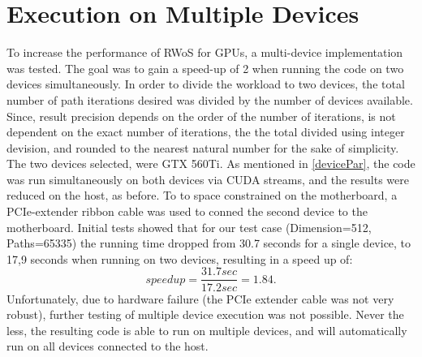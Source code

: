 \section{Execution on Multiple Devices}
To increase the performance of \Gls{RWoS} for \Glspl{GPU}, a multi-device implementation
was tested.  The goal was to gain a speed-up of 2 when running the code on two devices
simultaneously.  In order to divide the workload to two devices, the total number
of path iterations desired was divided by the number of devices available. Since,
result precision depends on the order of the number of iterations, is not dependent
on the exact number of iterations, the the total divided using integer devision,
and rounded to the nearest natural number for the sake of simplicity.  The two
devices selected, were GTX 560Ti. As mentioned in \ref{devicePar}, the code
was run simultaneously on both devices via CUDA streams, and the results were reduced
on the host, as before. To to space constrained on the motherboard, a PCIe-extender
ribbon cable was used to conned the second device to the motherboard. Initial tests
showed that for our test case (Dimension=512, Paths=65335) the running time dropped from
30.7 seconds for a single device, to 17,9 seconds when running on two devices,
resulting in a speed up of: $$ speedup = \frac{31.7 sec}{17.2 sec} = 1.84.$$ Unfortunately,
due to hardware failure (the PCIe extender cable was not very robust), further testing
of multiple device execution was not possible.  Never the less, the resulting code
is able to run on multiple devices, and will automatically run on all devices connected
to the host.

